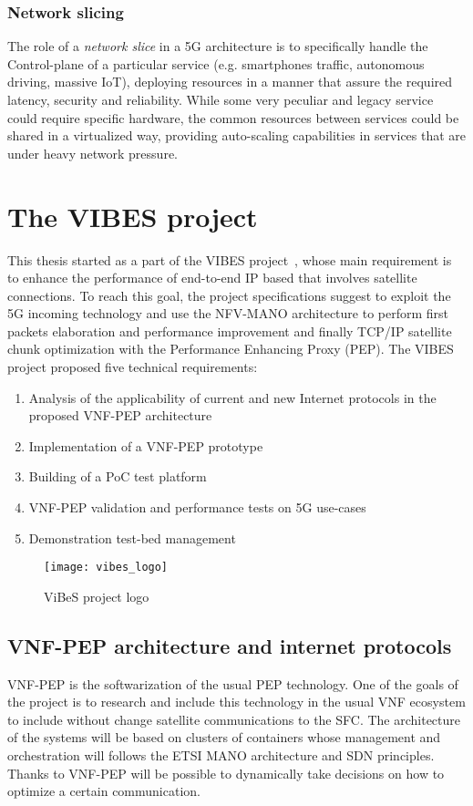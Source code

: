 \subsubsection{Network slicing}
The role of a \emph{network slice} in a 5G architecture is to specifically
handle the Control-plane of a particular service (e.g. smartphones traffic,
autonomous driving, massive IoT), deploying resources in a manner that assure
the required latency, security and reliability. While some very peculiar and
legacy service could require specific hardware, the common resources between
services could be shared in a virtualized way, providing auto-scaling
capabilities in services that are under heavy network pressure.

\section{The VIBES project}
This thesis started as a part of the VIBES project~\cite{vibesesa}, whose main
requirement is to enhance the performance of end-to-end IP based that involves
satellite connections. To reach this goal, the project specifications suggest to
exploit the 5G incoming technology and use the NFV-MANO architecture to perform
first packets elaboration and performance improvement and finally TCP/IP
satellite chunk optimization with the Performance Enhancing Proxy (PEP). The
VIBES project proposed five technical requirements:
\begin{enumerate}
  \item Analysis of the applicability of current and new Internet protocols in
  the proposed VNF-PEP architecture
  \item Implementation of a VNF-PEP prototype
  \item Building of a PoC test platform
  \item VNF-PEP validation and performance tests on 5G use-cases
  \item Demonstration test-bed management
\end{enumerate}

\begin{figure}[t]
 \centering
 \texttt{[image: vibes\_logo]}
 \caption{ViBeS project logo}
 \label{chap:background:img:vibes_logo}
\end{figure}

\subsection{VNF-PEP architecture and internet protocols}
VNF-PEP is the softwarization of the usual PEP technology. One of the goals of
the project is to research and include this technology in the usual VNF
ecosystem to include without change satellite communications to the SFC. The
architecture of the systems will be based on clusters of containers whose
management and orchestration will follows the ETSI MANO architecture and SDN
principles. Thanks to VNF-PEP will be possible to dynamically take decisions on
how to optimize a certain communication.

